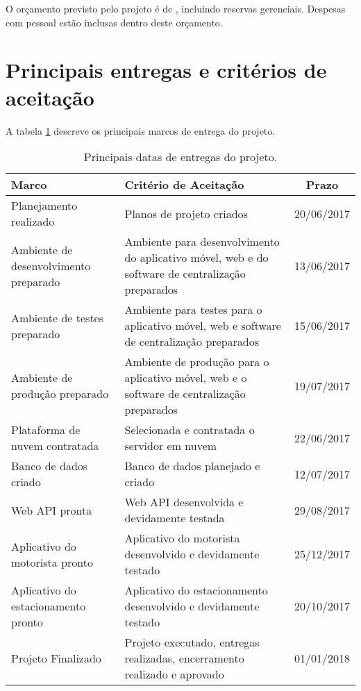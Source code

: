 O orçamento previsto pelo projeto é de \maximumBudget{}, incluindo reservas gerenciais. Despesas com pessoal estão inclusas dentro deste orçamento.

\section{Principais entregas e critérios de aceitação}

A tabela \ref{tab:entregas} descreve os principais marcos de entrega do projeto.

\begin{table}[h]
	\begin{tabularx}{.9\textwidth}{| X | X | c |}
		\hline
		\textbf{Marco}                               & \textbf{Critério de Aceitação}                     & \textbf{Prazo} \\
		\hline
		Planejamento realizado & Planos de projeto criados & 20/06/2017 \\
		\hline
		Ambiente de desenvolvimento preparado & Ambiente para desenvolvimento do aplicativo móvel, web e do software de centralização preparados & 13/06/2017 \\
		\hline
		Ambiente de testes preparado & Ambiente para testes para o aplicativo móvel, web e software de centralização preparados & 15/06/2017 \\
		\hline
		Ambiente de produção preparado & Ambiente de produção para o aplicativo móvel, web e o software de centralização preparados & 19/07/2017 \\
		\hline
		Plataforma de nuvem contratada & Selecionada e contratada o servidor em nuvem & 22/06/2017 \\
		\hline
		Banco de dados criado & Banco de dados planejado e criado & 12/07/2017\\
		\hline
		Web API pronta & Web API desenvolvida e devidamente testada & 29/08/2017 \\
		\hline
		Aplicativo do motorista pronto & Aplicativo do motorista desenvolvido e devidamente testado & 25/12/2017 \\
		\hline
		Aplicativo do estacionamento pronto & Aplicativo do estacionamento desenvolvido e devidamente testado & 20/10/2017 \\
		\hline
		Projeto Finalizado & Projeto executado, entregas realizadas, encerramento realizado e aprovado & 01/01/2018 \\
		\hline
	\end{tabularx}
	\centering
	\caption{Principais datas de entregas do projeto.}
	\label{tab:entregas}
\end{table}

